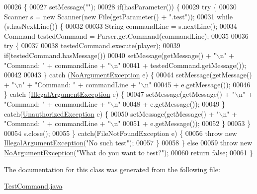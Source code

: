 \begin{DoxyCode}
00026                                                                                               \{
00027         setMessage(\textcolor{stringliteral}{""});
00028         \textcolor{keywordflow}{if}(hasParameter()) \{
00029             \textcolor{keywordflow}{try} \{
00030                 Scanner s = \textcolor{keyword}{new} Scanner(\textcolor{keyword}{new} File(getParameter() + \textcolor{stringliteral}{".test"}));
00031                 \textcolor{keywordflow}{while} (s.hasNextLine()) \{
00032 
00033                     String commandLine = s.nextLine();
00034                     Command testedCommand = Parser.getCommand(commandLine);
00035 
00036                     \textcolor{keywordflow}{try} \{
00037 
00038                         testedCommand.execute(player);
00039                         \textcolor{keywordflow}{if}(testedCommand.hasMessage())
00040                             setMessage(getMessage() + \textcolor{stringliteral}{"\(\backslash\)n"} + \textcolor{stringliteral}{"Command: "} + commandLine + \textcolor{stringliteral}{"\(\backslash\)n"}
00041                                     + testedCommand.getMessage());
00042 
00043                     \} \textcolor{keywordflow}{catch} (\hyperlink{classNoArgumentException}{NoArgumentException} e) \{
00044                         setMessage(getMessage() + \textcolor{stringliteral}{"\(\backslash\)n"} + \textcolor{stringliteral}{"Command: "} + commandLine + \textcolor{stringliteral}{"\(\backslash\)n"}
00045                                 + e.getMessage());
00046                     \} \textcolor{keywordflow}{catch} (\hyperlink{classIllegalArgumentException}{IllegalArgumentException} e) \{
00047                         setMessage(getMessage() + \textcolor{stringliteral}{"\(\backslash\)n"} + \textcolor{stringliteral}{"Command: "} + commandLine + \textcolor{stringliteral}{"\(\backslash\)n"}
00048                                 + e.getMessage());
00049                     \} \textcolor{keywordflow}{catch}(\hyperlink{classUnauthorizedException}{UnauthorizedException} e)  \{
00050                         setMessage(getMessage() + \textcolor{stringliteral}{"\(\backslash\)n"} + \textcolor{stringliteral}{"Command: "} + commandLine + \textcolor{stringliteral}{"\(\backslash\)n"}
00051                                 + e.getMessage());
00052                     \}
00053                 \}
00054                 s.close();
00055             \} \textcolor{keywordflow}{catch}(FileNotFoundException e) \{
00056                 \textcolor{keywordflow}{throw} \textcolor{keyword}{new} \hyperlink{classIllegalArgumentException}{IllegalArgumentException}(\textcolor{stringliteral}{"No such test"});
00057             \}
00058         \} \textcolor{keywordflow}{else}
00059             \textcolor{keywordflow}{throw} \textcolor{keyword}{new} \hyperlink{classNoArgumentException}{NoArgumentException}(\textcolor{stringliteral}{"What do you want to test?"});
00060         \textcolor{keywordflow}{return} \textcolor{keyword}{false};
00061     \}
\end{DoxyCode}


The documentation for this class was generated from the following file\-:\begin{DoxyCompactItemize}
\item 
\hyperlink{TestCommand_8java}{Test\-Command.\-java}\end{DoxyCompactItemize}
